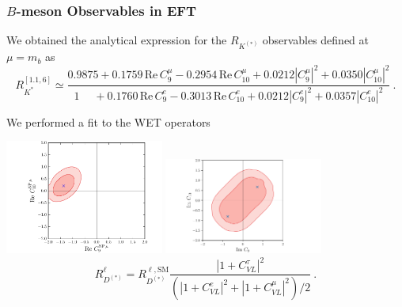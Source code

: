 \documentclass[mathserif, 10pt, dvipsnames]{beamer}
\begin{document}
\begin{frame}
    \frametitle{$B$-meson Observables in EFT}

    
    We obtained the analytical expression for the $R_{K^{(*)}}$ observables  defined at $\mu = m_b$ as
    {\scriptsize \begin{equation*}
    R_{K^*}^{[1.1,6]} \simeq \frac{0.9875+0.1759\, \mathrm{Re}\,C_9^\mu - 0.2954\,  \mathrm{Re}\, C_{10}^\mu + 0.0212|C_{9}^\mu|^2 + 0.0350 |C_{10}^\mu|^2}{1\,\  \ \ \ \ +0.1760\, \mathrm{Re}\,C_9^e - 0.3013\, \mathrm{Re}\,  C_{10}^e + 0.0212|C_9^e|^2 + 0.0357 |C_{10}^e|^2}\ .
    \end{equation*}}
    
    We performed a fit to the WET operators
    
    \includegraphics[width=0.39\textwidth]{figures/fitre}
    \includegraphics[width=0.39\textwidth]{figures/fitIm_C9C10.pdf}\\
    
    
    
    $$R_{D^{(*)}}^\ell = R_{D^{(*)}}^{\ell, \mathrm{SM}} \frac{|1+ C_{VL}^\tau|^2}{ (|1+C_{VL}^e|^2 + |1+C_{VL}^\mu|^2)/2}\ .$$
    \end{frame}
\end{document}
